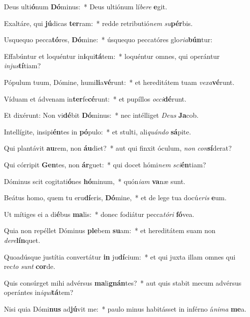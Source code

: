 \item Deus ulti\textbf{ó}num \textbf{Dó}minus:~* Deus ultiónum lí\textit{be}\textit{re} \textbf{e}git.
\item Exaltáre, qui \textbf{jú}dicas \textbf{ter}ram:~* redde retributió\textit{nem} \textit{su}\textbf{pér}bis.
\item Usquequo pecca\textbf{tó}res, \textbf{Dó}mine:~* úsquequo peccatóres glo\textit{ri}\textit{a}\textbf{bún}tur:
\item Effabúntur et loquéntur in\textbf{i}qui\textbf{tá}tem:~* loquéntur omnes, qui operántur \textit{in}\textit{jus}\textbf{tí}tiam?
\item Pópulum tuum, Dómine, humi\textbf{li}a\textbf{vé}runt:~* et hereditátem tuam \textit{ve}\textit{xa}\textbf{vé}runt.
\item Víduam et ádvenam in\textbf{ter}fe\textbf{cé}runt:~* et pupíllos \textit{oc}\textit{ci}\textbf{dé}runt.
\item Et dixérunt: Non vi\textbf{dé}bit \textbf{Dó}minus:~* nec intélliget \textit{De}\textit{us} \textbf{Ja}cob.
\item Intellígite, insipi\textbf{én}tes in \textbf{pó}pulo:~* et stulti, ali\textit{quán}\textit{do} \textbf{sá}pite.
\item Qui plantávit \textbf{au}rem, non \textbf{áu}diet?~* aut qui finxit óculum, \textit{non} \textit{con}\textbf{sí}derat?
\item Qui córripit \textbf{Gen}tes, non \textbf{ár}guet:~* qui docet hómi\textit{nem} \textit{sci}\textbf{én}tiam?
\item Dóminus scit cogitati\textbf{ó}nes \textbf{hó}minum,~* quón\textit{i}\textit{am} \textbf{va}næ sunt.
\item Beátus homo, quem tu eru\textbf{dí}eris, \textbf{Dó}mine,~* et de lege tua docú\textit{e}\textit{ris} \textbf{e}um.
\item Ut mítiges ei a di\textbf{é}bus \textbf{ma}lis:~* donec fodiátur pecca\textit{tó}\textit{ri} \textbf{fó}vea.
\item Quia non repéllet Dóminus \textbf{ple}bem \textbf{su}am:~* et hereditátem suam non \textit{de}\textit{re}\textbf{lín}quet.
\item Quoadúsque justítia convertátur \textbf{in} ju\textbf{dí}cium:~* et qui juxta illam omnes qui rec\textit{to} \textit{sunt} \textbf{cor}de.
\item Quis consúrget mihi advérsus \textbf{ma}li\textbf{gnán}tes?~* aut quis stabit mecum advérsus operántes in\textit{i}\textit{qui}\textbf{tá}tem?
\item Nisi quia Dómi\textbf{nus} ad\textbf{jú}vit me:~* paulo minus habitásset in inférno á\textit{ni}\textit{ma} \textbf{me}a.
